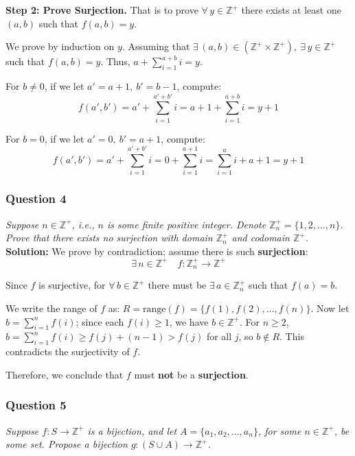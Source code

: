 \documentclass[
	letterpaper, %
	11pt, %
]{CSUniSchoolLabReport}
\begin{document}
\textbf{Step 2: Prove Surjection.}
That is to prove $\forall\, y \in \mathbb{Z}^+$ there exists at least one $(a,b)$ such that $f(a,b) = y$.

We prove by induction on $y$.
Assuming that $\exists\, (a,b) \in (\mathbb{Z}^+ \times \mathbb{Z}^+),\ \exists\, y \in \mathbb{Z}^+$ such that $f(a,b) = y$.
Thus, $a + \sum_{i=1}^{a+b} i = y$.

For $b \neq 0$, if we let $a' = a+1,\ b' = b-1$, compute:
\[
f(a',b') = a' + \sum_{i=1}^{a'+b'} i = a+1 + \sum_{i=1}^{a+b} i = y+1
\]

For $b = 0$, if we let $a' = 0,\ b' = a+1$, compute:
\[
f(a',b') = a' + \sum_{i=1}^{a'+b'} i = 0 + \sum_{i=1}^{a+1} i = \sum_{i=1}^{a} i + a + 1 = y + 1
\]

\pagebreak

\subsubsection*{Question 4}
\textit{Suppose $n \in \mathbb{Z}^+$, i.e., $n$ is some finite positive integer. Denote $\mathbb{Z}^+_n = \{1, 2, \ldots, n\}$. Prove that there exists no surjection with domain $\mathbb{Z}^+_n$ and codomain $\mathbb{Z}^+$.} \\

\textbf{Solution:} We prove by contradiction; assume there is such \textbf{surjection}:
\[
\exists\, n \in \mathbb{Z}^+ \quad f:\mathbb{Z}^+_n \to \mathbb{Z}^+
\]

Since $f$ is surjective, for $\forall\, b \in \mathbb{Z}^+$ there must be $\exists\, a \in \mathbb{Z}^+_n$ such that $f(a) = b$.

We write the range of $f$ as: $R = \mathrm{range}(f) = \{f(1), f(2), \ldots, f(n)\}$.
Now let $b = \sum_{i=1}^{n} f(i)$; since each $f(i) \geq 1$, we have $b \in \mathbb{Z}^+$.
For $n \geq 2$, $b = \sum_{i=1}^{n} f(i) \geq f(j) + (n-1) > f(j)$ for all $j$, so $b \notin R$.
This contradicts the surjectivity of $f$.

Therefore, we conclude that $f$ must \textbf{not} be a \textbf{surjection}.

\pagebreak

\subsubsection*{Question 5}
\textit{Suppose $f: S \to \mathbb{Z}^+$ is a bijection, and let $A = \{a_1, a_2, \ldots, a_n\}$, for some $n \in \mathbb{Z}^+$, be some set. Propose a bijection $g: (S \cup A) \to \mathbb{Z}^+$.} \\
\end{document}

